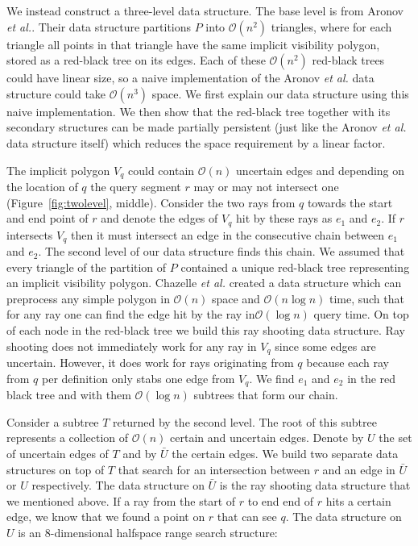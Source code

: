 \documentclass[a4paper, UKenglish]{lipics-v2018}
\newcommand{\etal}{\textit{et al.}\xspace}
\begin{document}
We instead construct a three-level data structure. The base level is from Aronov \etal. Their data structure partitions $P$ into $\mathcal{O}(n^2)$ triangles, where for each triangle all points in that triangle have the same implicit visibility polygon, stored as a red-black tree on its edges. Each of these $\mathcal{O}(n^2)$ red-black trees could have linear size, so a naive implementation of the Aronov \etal data structure could take $\mathcal{O}(n^3)$ space. We first explain our data structure using this naive implementation. We then show that the red-black tree together with its secondary structures can be made partially persistent (just like the Aronov \etal data structure itself) which reduces the space requirement by a linear factor.

The implicit polygon $V_q$ could contain $\mathcal{O}(n)$ uncertain edges and depending on the location of $q$ the query segment $r$ may or may not intersect one (Figure~\ref{fig:twolevel}, middle). Consider the two rays from $q$ towards the start and end point of $r$ and denote the edges of $V_q$ hit by these rays as $e_1$ and $e_2$. If $r$ intersects $V_q$ then it must intersect an edge in the consecutive chain between $e_1$ and $e_2$. The second level of our data structure finds this chain. We assumed that every triangle of the partition of $P$ contained a unique red-black tree representing an implicit visibility polygon. Chazelle \etal \cite{chazelle1994ray}  created a data structure which can preprocess any simple polygon in $\mathcal{O}(n)$ space and $\mathcal{O}(n \log n)$ time, such that for any ray one can find the edge hit by the ray in$\mathcal{O}(\log n)$ query time. On top of each node in the red-black tree we build this ray shooting data structure. Ray shooting does not immediately work for any ray in $V_q$ since some edges are uncertain. However, it does work for rays originating from $q$ because each ray from $q$ per definition only stabs one edge from $V_q$.  We find $e_1$ and $e_2$ in the red black tree and with them $\mathcal{O}(\log n)$ subtrees that form our chain.

Consider a subtree $T$ returned by the second level. The root of this subtree represents a collection of $\mathcal{O}(n)$ certain and uncertain edges. Denote by $U$ the set of uncertain edges of $T$ and by $\bar{U}$ the certain edges. We build two separate data structures on top of $T$ that search for an intersection between $r$ and an edge in $\bar{U}$ or $U$ respectively. The data structure on $\bar{U}$ is the ray shooting data structure that we mentioned above. If a ray from the start of $r$ to end end of $r$ hits a certain edge, we know that we found a point on $r$ that can see $q$. The data structure on $U$ is an $8$-dimensional halfspace range search structure: 
\end{document}
